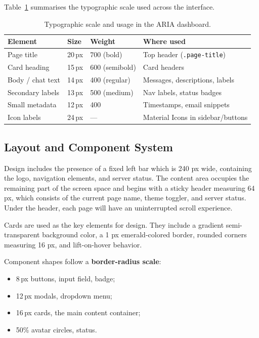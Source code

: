 Table~\ref{tab:type-scale} summarises the typographic scale used across the interface.

\begin{table}[H]
\centering
\caption{Typographic scale and usage in the ARIA dashboard.}
\label{tab:type-scale}
\small
\renewcommand{\arraystretch}{1.4}
\begin{tabular}{@{}lllp{5.2cm}@{}}
\toprule
\textbf{Element} & \textbf{Size} & \textbf{Weight} & \textbf{Where used} \\
\midrule
Page title          & 20\,px & 700 (bold)     & Top header (\texttt{.page-title}) \\
Card heading        & 15\,px & 600 (semibold) & Card headers \\
Body / chat text    & 14\,px & 400 (regular)  & Messages, descriptions, labels \\
Secondary labels    & 13\,px & 500 (medium)   & Nav labels, status badges \\
Small metadata      & 12\,px & 400            & Timestamps, email snippets \\
Icon labels         & 24\,px & ---            & Material Icons in sidebar/buttons \\
\bottomrule
\end{tabular}
\end{table}


\subsection{Layout and Component System}

Design includes the presence of a fixed left bar which is 240 px wide, containing the logo, navigation elements, and server status. The content area occupies the remaining part of the screen space and begins with a sticky header measuring 64 px, which consists of the current page name, theme toggler, and server status. Under the header, each page will have an uninterrupted scroll experience.

Cards are used as the key elements for design. They include a gradient semi-transparent background color, a 1 px emerald-colored border, rounded corners measuring 16 px, and lift-on-hover behavior.

Component shapes follow a \textbf{border-radius scale}:
\begin{itemize}
    \item 8\,px buttons, input field, badge;
    \item 12\,px modals, dropdown menu;
    \item 16\,px cards, the main content container;
    \item 50\% avatar circles, status.
\end{itemize}



